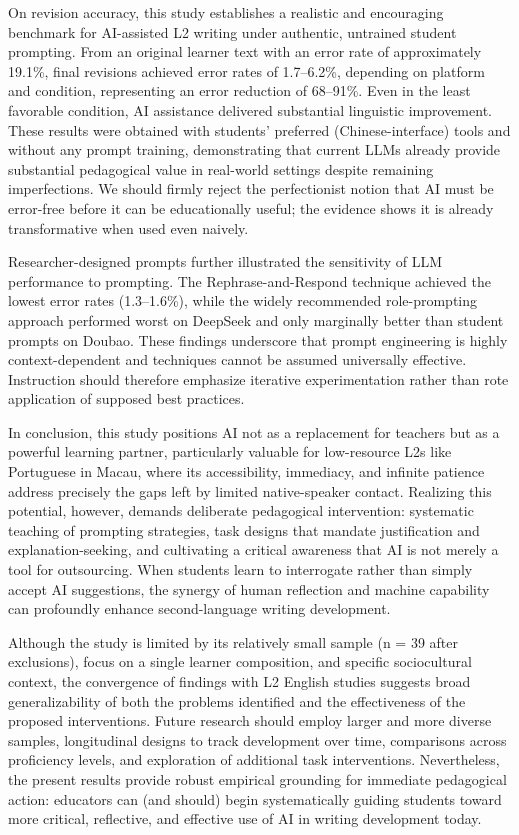 \documentclass[english]{textolivre}
\begin{document}
On revision accuracy, this study establishes a realistic and encouraging benchmark for AI-assisted L2 writing under authentic, untrained student prompting. From an original learner text with an error rate of approximately 19.1\%, final revisions achieved error rates of 1.7–6.2\%, depending on platform and condition, representing an error reduction of 68–91\%. Even in the least favorable condition, AI assistance delivered substantial linguistic improvement. These results were obtained with students’ preferred (Chinese-interface) tools and without any prompt training, demonstrating that current LLMs already provide substantial pedagogical value in real-world settings despite remaining imperfections. We should firmly reject the perfectionist notion that AI must be error-free before it can be educationally useful; the evidence shows it is already transformative when used even naively.

Researcher-designed prompts further illustrated the sensitivity of LLM performance to prompting. The Rephrase-and-Respond technique achieved the lowest error rates (1.3–1.6\%), while the widely recommended role-prompting approach performed worst on DeepSeek and only marginally better than student prompts on Doubao. These findings underscore that prompt engineering is highly context-dependent and techniques cannot be assumed universally effective. Instruction should therefore emphasize iterative experimentation rather than rote application of supposed best practices.

In conclusion, this study positions AI not as a replacement for teachers but as a powerful learning partner, particularly valuable for low-resource L2s like Portuguese in Macau, where its accessibility, immediacy, and infinite patience address precisely the gaps left by limited native-speaker contact. Realizing this potential, however, demands deliberate pedagogical intervention: systematic teaching of prompting strategies, task designs that mandate justification and explanation-seeking, and cultivating a critical awareness that AI is not merely a tool for outsourcing. When students learn to interrogate rather than simply accept AI suggestions, the synergy of human reflection and machine capability can profoundly enhance second-language writing development.

Although the study is limited by its relatively small sample (n = 39 after exclusions), focus on a single learner composition, and specific sociocultural context, the convergence of findings with L2 English studies suggests broad generalizability of both the problems identified and the effectiveness of the proposed interventions. Future research should employ larger and more diverse samples, longitudinal designs to track development over time, comparisons across proficiency levels, and exploration of additional task interventions. Nevertheless, the present results provide robust empirical grounding for immediate pedagogical action: educators can (and should) begin systematically guiding students toward more critical, reflective, and effective use of AI in writing development today.
\end{document}
